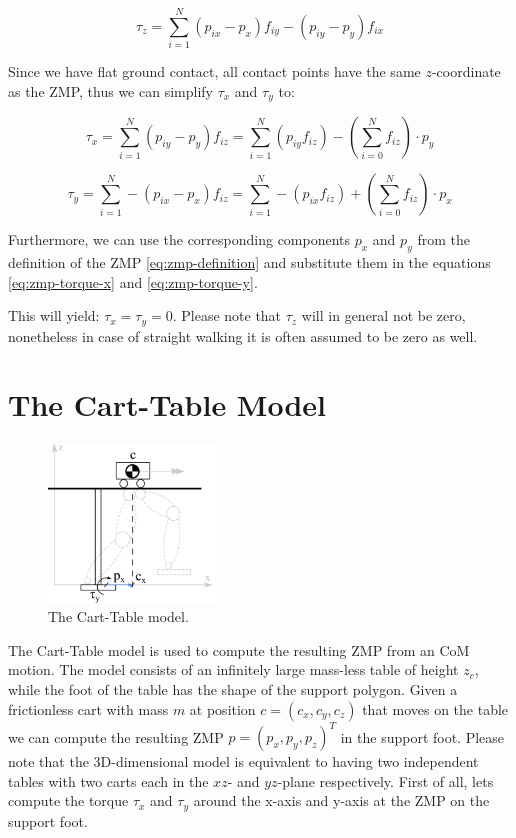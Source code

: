 \documentclass[english,ngerman]{KITreprt}
\begin{document}
\begin{equation}
\tau_z = \sum^N_{i=1} (p_{ix} - p_x) f_{iy} - (p_{iy} - p_y) f_{ix}
\end{equation}

Since we have flat ground contact, all contact points have the same
$z$-coordinate as the ZMP, thus we can simplify $\tau_x$ and $\tau_y$
to:

\begin{equation} \label{eq:zmp-torque-x}
\tau_x = \sum^N_{i=1} (p_{iy} - p_y) f_{iz} = \sum^N_{i=1} (p_{iy} f_{iz}) - (\sum^N_{i=0} f_{iz}) \cdot p_y
\end{equation}

\begin{equation}\label{eq:zmp-torque-y}
\tau_y = \sum^N_{i=1} - (p_{ix} - p_x) f_{iz} = \sum^N_{i=1} - (p_{ix} f_{iz}) + (\sum^N_{i=0} f_{iz}) \cdot p_x
\end{equation}

Furthermore, we can use the corresponding components $p_x$ and $p_y$
from the definition of the ZMP \ref{eq:zmp-definition} and substitute
them in the equations \ref{eq:zmp-torque-x} and \ref{eq:zmp-torque-y}.

This will yield: $\tau_x = \tau_y = 0$. Please note that $\tau_z$ will
in general not be zero, nonetheless in case of straight walking it is
often assumed to be zero as well.

\section{The Cart-Table Model}\label{section:cart-table}

\begin{figure}
  \begin{center}
     \includegraphics[width=0.4\textwidth]{images/carttable.png}
  \end{center}
  \caption{The Cart-Table model.}
\end{figure}

The Cart-Table model is used to compute the resulting ZMP from an CoM
motion. The model consists of an infinitely large mass-less table of
height $z_c$, while the foot of the table has the shape of the support
polygon. Given a frictionless cart with mass $m$ at position
$c = (c_x, c_y, c_z)$ that moves on the table we can compute the
resulting ZMP $p = (p_x, p_y, p_z)^T$ in the support foot. Please note
that the 3D-dimensional model is equivalent to having two independent
tables with two carts each in the $xz$- and $yz$-plane respectively.
First of all, lets compute the torque $\tau_x$ and $\tau_y$ around the
x-axis and y-axis at the ZMP on the support foot.
\end{document}
